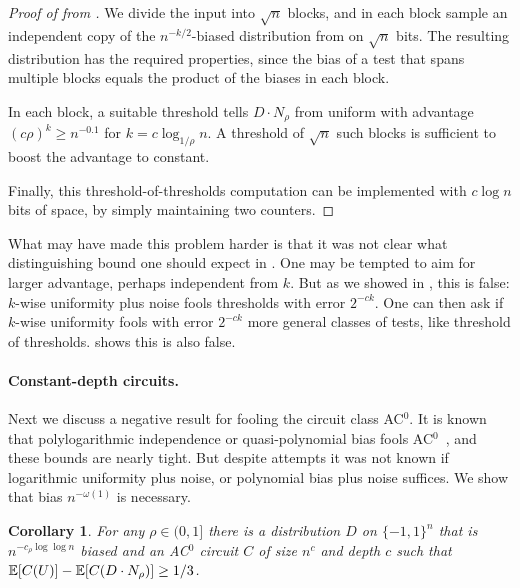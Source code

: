 \documentclass[10pt,a4paper]{article}
\newtheorem{corollary}[theorem]{Corollary}
\theoremstyle{definition}
\newcommand{\E}{\mathop{\mathbb{E}\/}}
\newcommand{\pmo}{\{-1,1\}}
\begin{document}
\begin{proof}[Proof of  from ]
We divide the input into $\sqrt{n}$ blocks, and in each block sample an independent copy of the $n^{-k/2}$-biased
distribution from  on $\sqrt{n}$
bits.  The resulting distribution has the required properties, since the bias of a test that spans multiple blocks equals the product of the biases in each block.

In each block, a suitable threshold tells $D \cdot N_\rho$ from uniform with advantage $(c\rho)^k \geq n^{-0.1}$
for $k=c\log_{1/\rho} n$.  A threshold of $\sqrt{n}$
such blocks is sufficient to boost the advantage to constant.

Finally, this threshold-of-thresholds computation can be implemented with $c \log n$ bits of space, by simply maintaining two counters.
\end{proof}

What may have made this problem harder is that it was not clear what
distinguishing bound one should expect in .
One may be tempted to aim for larger advantage, perhaps independent from $k$. But as we showed in ,
this is false: $k$-wise uniformity plus noise fools thresholds
with error $2^{-ck}$. One can then ask if $k$-wise uniformity 
fools with error $2^{-ck}$ more general classes of tests, like threshold
of thresholds.  shows this is also false.

\paragraph{Constant-depth circuits.}
Next we discuss a negative result for fooling the circuit class AC$^{0}$.  It is known that polylogarithmic independence or quasi-polynomial bias fools AC$^{0}$~\cite{Bazzi07,Razborov09,Braverman10,Tal17}, and these bounds are nearly tight.  But despite attempts \cite{LV-sum} it was not known if logarithmic uniformity plus noise, or polynomial bias plus noise suffices. We show that bias $n^{-\omega(1)}$ is necessary.

\begin{corollary} \label{cor:ac0-const-advant} For any $\rho\in(0,1]$ there is a distribution $D$ on $\pmo^n$
that is $n^{-c_\rho \log\log n}$ biased and an \textnormal{AC}$^0$ circuit $C$ of size $n^c$ and depth $c$ such that $\E[C(U)]-\E[C(D \cdot N_\rho)] \geq 1/3$.
\end{corollary}
\end{document}
